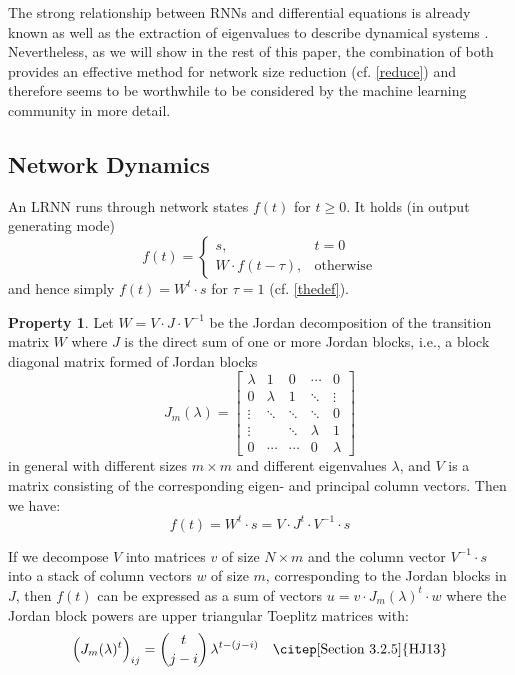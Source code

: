 \documentclass{sn-jnl}
\theoremstyle{definition}
\newtheorem{prop}{Property}
\begin{document}
The strong relationship between RNNs and differential equations is already known
\citep[Section~9]{KB+16} as well as the extraction of eigenvalues to describe
dynamical systems \citep[Section~5]{Str15}. Nevertheless, as we will show in the
rest of this paper, the combination of both provides an effective method for
network size reduction (cf. \cref{reduce}) and therefore seems to be worthwhile
to be considered by the machine learning community in more detail.

\subsection{Network Dynamics}\label{dynamics}

An LRNN runs through network states $f(t)$ for $t
\ge 0$. It holds (in output generating mode)
\[ f(t) = \left\{ \begin{array}{ll}
	s, & t=0\\
	W \cdot f(t-\tau), & \text{otherwise}
\end{array} \right. \]
and hence simply $f(t) = W^t \cdot s$ for $\tau = 1$ (cf. \cref{thedef}).

\begin{prop}\label{jordan}
Let $W = V \cdot J \cdot V^{-1}$ be the Jordan decomposition of the transition
matrix $W$ where $J$ is the direct sum of one or more Jordan blocks, i.e., a
block diagonal matrix formed of Jordan blocks
\[ J_m(\lambda) = \left[ \begin{array}{*{5}{c}}
  \lambda & 1 & 0 & \cdots & 0\\
  0 & \lambda & 1 & \ddots & \vdots\\
  \vdots & \ddots & \ddots & \ddots & 0\\
  \vdots & & \ddots & \lambda & 1\\
  0 & \cdots & \cdots & 0 & \lambda
\end{array} \right] \]
in general with different sizes $m \times m$ and different eigenvalues $\lambda$,
and $V$ is a matrix consisting of the corresponding eigen- and principal column vectors.
Then we have: \[ f(t) = W^t \cdot s = V \cdot J^t \cdot V^{-1} \cdot s \]

If we decompose $V$ into matrices $v$ of size $N \times m$ and the column vector
$V^{-1} \cdot s$ into a stack of column vectors $w$ of size $m$, corresponding
to the Jordan blocks in $J$, then $f(t)$ can be expressed as a sum of vectors $u
= v \cdot J_m(\lambda)^t \cdot w$ where the Jordan block powers are upper
triangular Toeplitz matrices with:
\begin{equation}\label{power}
  \Big( J_m(\lambda)^t \Big)_{ij} = \binom{t}{j-i}\,\lambda^{t-(j-i)}
	\quad\text{\citep[Section~3.2.5]{HJ13}}
\end{equation}
\end{prop}
\end{document}
